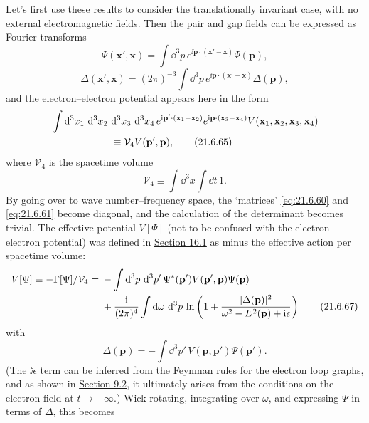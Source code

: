 Let's first use these results to consider the translationally invariant case, with no external electromagnetic fields. Then the pair and gap fields can be expressed as Fourier transforms
\begin{equation}
\Psi(\mathbf x',\mathbf x)
=\int \dd^3p\,e^{\ii\mathbf p\cdot(\mathbf x'-\mathbf x)}\Psi(\mathbf p),
\tag{21.6.63}\label{eq:21.6.63}
\end{equation}
\begin{equation}
\Delta(\mathbf x',\mathbf x)
=(2\pi)^{-3}\int \dd^3p\,e^{\ii\mathbf p\cdot(\mathbf x'-\mathbf x)}
\Delta(\mathbf p),
\tag{21.6.64}\label{eq:21.6.64}
\end{equation}
and the electron--electron potential appears here in the form
\begin{align}
&\int \mathop{}\!\mathrm{d}^3x_1\,\mathop{}\!\mathrm{d}^3x_2\,\mathop{}\!\mathrm{d}^3x_3\,\mathop{}\!\mathrm{d}^3x_4\,
e^{\mathrm{i}\mathbf p'\cdot(\mathbf x_1-\mathbf x_2)}
e^{\mathrm{i}\mathbf p\cdot(\mathbf x_3-\mathbf x_4)}
V(\mathbf x_1,\mathbf x_2,\mathbf x_3,\mathbf x_4)
\notag\\
&\hspace{6em}\equiv\mathcal V_4 V(\mathbf p',\mathbf p),
\tag{21.6.65}\label{eq:21.6.65}
\end{align}
where $\mathcal V_4$ is the spacetime volume
\begin{equation}
\mathcal V_4\equiv\int \dd^3x\int \dd t\,1.
\tag{21.6.66}\label{eq:21.6.66}
\end{equation}
By going over to wave number--frequency space, the `matrices' \eqref{eq:21.6.60} and \eqref{eq:21.6.61} become diagonal, and the calculation of the determinant becomes trivial. The effective potential $V[\Psi]$ (not to be confused with the electron--electron potential) was defined in \hyperref[sec:16.1]{Section 16.1} as minus the effective action per spacetime volume:
\begin{align}
V[\Psi]\equiv-\Gamma[\Psi]/\mathcal V_4
={}&-\int \mathop{}\!\mathrm{d}^3p\,\mathop{}\!\mathrm{d}^3p'\,
\Psi^*(\mathbf p')V(\mathbf p',\mathbf p)\Psi(\mathbf p)
\notag\\
&+\frac{\mathrm{i}}{(2\pi)^4}\int \mathop{}\!\mathrm{d}\omega\,\mathop{}\!\mathrm{d}^3p\,
\ln\left(
1+\frac{|\Delta(\mathbf p)|^2}
{\omega^2-E^2(\mathbf p)+\mathrm{i}\epsilon}
\right)
\tag{21.6.67}\label{eq:21.6.67}
\end{align}
with
\begin{equation}
\Delta(\mathbf p)=-\int \dd^3p'\,
V(\mathbf p,\mathbf p')\Psi(\mathbf p').
\tag{21.6.68}\label{eq:21.6.68}
\end{equation}
(The $\ii\epsilon$ term can be inferred from the Feynman rules for the electron loop graphs, and as shown in \hyperref[sec:9.2]{Section 9.2}, it ultimately arises from the conditions on the electron field at $t\to\pm\infty$.) Wick rotating, integrating over $\omega$, and expressing $\Psi$ in terms of $\Delta$, this becomes
